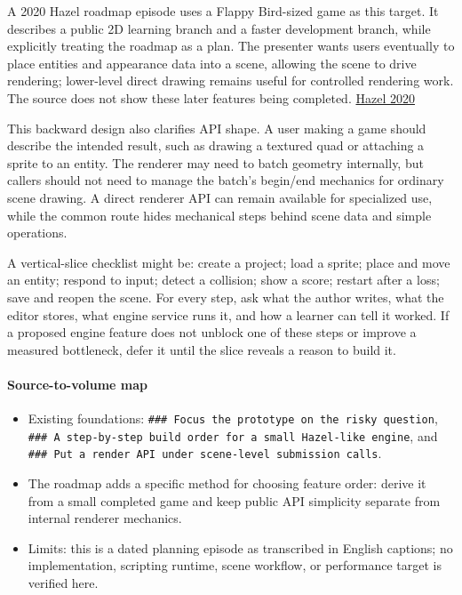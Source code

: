 A 2020 Hazel roadmap episode uses a Flappy Bird-sized game as this target. It describes a public 2D learning branch and a faster development branch, while explicitly treating the roadmap as a plan. The presenter wants users eventually to place entities and appearance data into a scene, allowing the scene to drive rendering; lower-level direct drawing remains useful for controlled rendering work. The source does not show these later features being completed. \href{https://www.youtube.com/watch?v=6BHhNELSnDU}{Hazel 2020}

This backward design also clarifies API shape. A user making a game should describe the intended result, such as drawing a textured quad or attaching a sprite to an entity. The renderer may need to batch geometry internally, but callers should not need to manage the batch's begin/end mechanics for ordinary scene drawing. A direct renderer API can remain available for specialized use, while the common route hides mechanical steps behind scene data and simple operations.

A vertical-slice checklist might be: create a project; load a sprite; place and move an entity; respond to input; detect a collision; show a score; restart after a loss; save and reopen the scene. For every step, ask what the author writes, what the editor stores, what engine service runs it, and how a learner can tell it worked. If a proposed engine feature does not unblock one of these steps or improve a measured bottleneck, defer it until the slice reveals a reason to build it.

\paragraph{Source-to-volume map}\label{source-to-volume-map}

\begin{itemize}
\tightlist
\item
  Existing foundations: \texttt{\#\#\#\ Focus\ the\ prototype\ on\ the\ risky\ question}, \texttt{\#\#\#\ A\ step-by-step\ build\ order\ for\ a\ small\ Hazel-like\ engine}, and \texttt{\#\#\#\ Put\ a\ render\ API\ under\ scene-level\ submission\ calls}.
\item
  The roadmap adds a specific method for choosing feature order: derive it from a small completed game and keep public API simplicity separate from internal renderer mechanics.
\item
  Limits: this is a dated planning episode as transcribed in English captions; no implementation, scripting runtime, scene workflow, or performance target is verified here.
\end{itemize}

